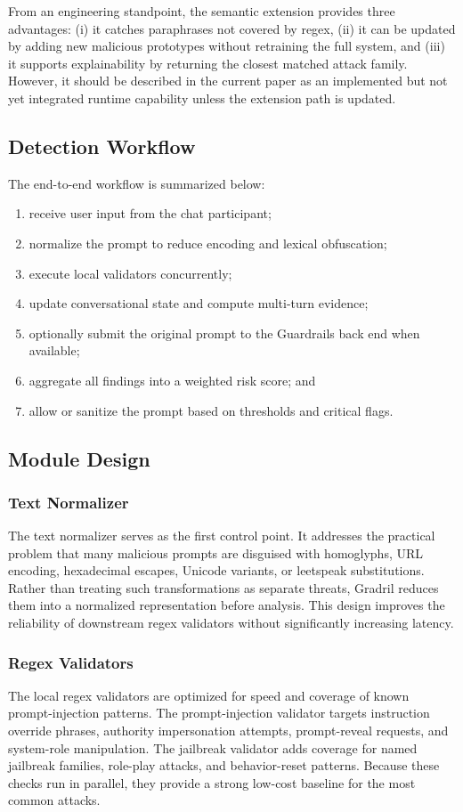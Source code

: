 \documentclass[journal]{IEEEtran}
\begin{document}
From an engineering standpoint, the semantic extension provides three advantages: (i) it catches paraphrases not covered by regex, (ii) it can be updated by adding new malicious prototypes without retraining the full system, and (iii) it supports explainability by returning the closest matched attack family. However, it should be described in the current paper as an implemented but not yet integrated runtime capability unless the extension path is updated.

\subsection{Detection Workflow}
The end-to-end workflow is summarized below:
\begin{enumerate}
    \item receive user input from the chat participant;
    \item normalize the prompt to reduce encoding and lexical obfuscation;
    \item execute local validators concurrently;
    \item update conversational state and compute multi-turn evidence;
    \item optionally submit the original prompt to the Guardrails back end when available;
    \item aggregate all findings into a weighted risk score; and
    \item allow or sanitize the prompt based on thresholds and critical flags.
\end{enumerate}

\subsection{Module Design}
\subsubsection{Text Normalizer}
The text normalizer serves as the first control point. It addresses the practical problem that many malicious prompts are disguised with homoglyphs, URL encoding, hexadecimal escapes, Unicode variants, or leetspeak substitutions. Rather than treating such transformations as separate threats, Gradril reduces them into a normalized representation before analysis. This design improves the reliability of downstream regex validators without significantly increasing latency.

\subsubsection{Regex Validators}
The local regex validators are optimized for speed and coverage of known prompt-injection patterns. The prompt-injection validator targets instruction override phrases, authority impersonation attempts, prompt-reveal requests, and system-role manipulation. The jailbreak validator adds coverage for named jailbreak families, role-play attacks, and behavior-reset patterns. Because these checks run in parallel, they provide a strong low-cost baseline for the most common attacks.
\end{document}
